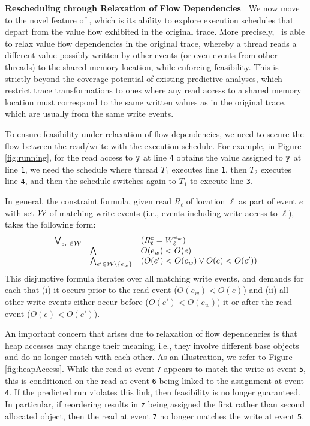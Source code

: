 {\bf Rescheduling through Relaxation of Flow Dependencies\ } We now move to the novel feature of \tool, which is its ability to explore execution schedules that depart from the value flow exhibited in the original trace. More precisely, \tool\ is able to relax value flow dependencies in the original trace, whereby a thread reads a
different value possibly written by other events (or even events from other threads) to the shared memory location, while enforcing feasibility.
 This is strictly beyond the coverage potential of existing predictive analyses, which restrict trace transformations to ones where any read access to a shared memory location must correspond to the same written values as in the original trace, which are usually from the same write events. 

To ensure feasibility under relaxation of flow dependencies, we need to secure the flow between the read/write with the execution schedule. 
For example, in Figure \ref{fig:running}, for the read access to ${\tt y}$ at line {\tt 4} obtains the value assigned to ${\tt y}$ at line {\tt 1}, we need the schedule where  thread $T_1$ executes line {\tt 1}, then $T_2$ executes line {\tt 4}, and then the schedule switches again to $T_1$ to execute line {\tt 3}.



In general, the constraint formula, given read $R_{\ell}$ of location $\ell$ as part of event $e$ with set ${\cal W}$ of matching write events (i.e., events including write access to $\ell$), takes the following form:
$$
\begin{array}{rll}
\bigvee_{e_w \in {\cal W}} &  & (R^{e}_{\ell} = W^{e_w}_{\ell}) \\
&		\bigwedge 	&  O(e_w) < O(e) \\
&		\bigwedge_{e' \in {\cal W} \setminus \{ e_w \}} & (O(e') < O(e_w) \vee O(e) < O(e'))
\end{array}
$$
This disjunctive formula iterates over all matching write events, and demands for each that (i) it occurs prior to the read event ($O(e_w) < O(e)$) and (ii) all other write events either occur before ($O(e') < O(e_w)$) it or after the read event
($O(e) < O(e')$).

An important concern that arises due to relaxation of flow dependencies is that heap accesses may change their meaning, i.e., they involve different base objects and do no longer match with each other. As an illustration, we refer to Figure \ref{fig:heapAccess}. While the read at event {\tt 7} appears to match the write at event {\tt 5}, this is conditioned on the read at event {\tt 6} being linked to the assignment at event {\tt 4}. If the predicted run violates this link, then feasibility is no longer guaranteed. In particular, if reordering results in {\tt z} being assigned the first rather than second allocated object, then the read at event {\tt 7} no longer matches the write  at event {\tt 5}.

